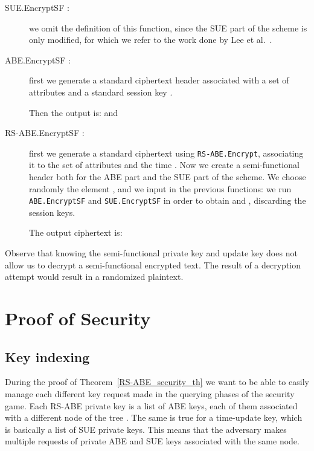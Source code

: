 \documentclass[a4paper,10pt]{article}
\newcommand{\maps}[2]{}
\newcommand{\mapssingleoutput}[2]{}
\newcommand{\algorithm}[2]{\texttt{#1.#2}}
\newcommand{\algorithmdef}[4]{\item[#1.#2 \maps{#3}{#4}:]}
\newcommand{\algorithmdefsingleoutput}[4]{\item[#1.#2 \mapssingleoutput{#3}{#4}:] }
\begin{document}
\begin{description}
\begin{comment}
\algorithmdefsingleoutput{RS-ABE}{UpdateKeySF}{\mathrm{PK},\mathrm{MK},T,R}{\mathrm{TK}_{T,R}}
\end{comment}
\algorithmdef{SUE}{EncryptSF}{\mathrm{PI},\mathrm{PK},T,M,c}{C,\mathrm{CH}_{T}} we omit the definition of this  function, since the SUE part of the scheme is only modified, for which we refer to the work done by Lee et al.~\cite{lee2013RSABE}.

\algorithmdef{ABE}{EncryptSF}{\mathrm{PI},\mathrm{PK},S,M,c}{C,\mathrm{CH}_{S}} first we generate a standard ciphertext header  associated with a set of attributes  and a standard session key .
	
	Then the output is:  and 
	
	
	\algorithmdefsingleoutput{RS-ABE}{EncryptSF}{\mathrm{PI},\mathrm{PK},M,S,T}{\mathrm{CT}_{S,T}} first we generate a standard ciphertext  using \algorithm{RS-ABE}{Encrypt}, associating it to the set of attributes  and the time .
	Now we create a semi-functional header both for the ABE part and the SUE part of the scheme.
	We choose randomly the element , and	
	we input  in the previous functions: we run \algorithm{ABE}{EncryptSF} and \algorithm{SUE}{EncryptSF} in order to obtain  and , discarding the session keys.
	
	The output ciphertext is:
	
	
	\end{description}
	


	Observe that knowing the semi-functional private key and update key does not allow us to decrypt a semi-functional encrypted text. The result of a decryption attempt would result in a randomized plaintext.

	\section{Proof of Security}\label{sec:proof}
	\subsection{Key indexing}
	During the proof of Theorem~\ref{RS-ABE_security_th} we want to be able to easily manage each different key request made in the querying phases of the security game.
	Each RS-ABE private key is a list of ABE keys, each of them associated with a different node of the tree . The same is true for a time-update key, which is basically a list of SUE private keys.
	This means that the adversary makes multiple requests of private ABE and SUE keys associated with the same node.
	
\end{document}
